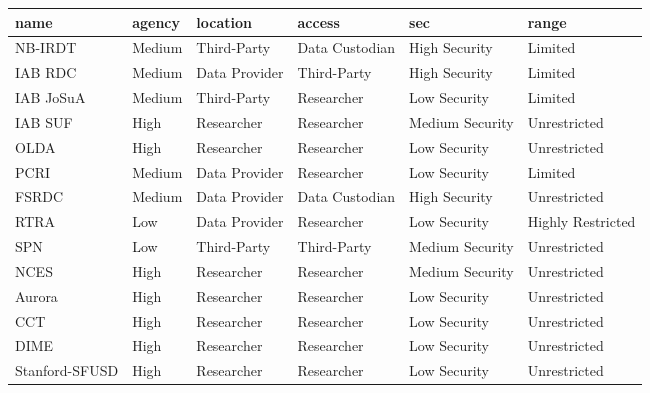 \begin{tabulary}{1.0\textwidth}{LLLLLL}
  \toprule
name & agency & location & access & sec & range \\ 
  \midrule
NB-IRDT & Medium & Third-Party & Data Custodian & High Security & Limited \\ 
  IAB RDC & Medium & Data Provider & Third-Party & High Security & Limited \\ 
  IAB JoSuA & Medium & Third-Party & Researcher & Low Security & Limited \\ 
  IAB SUF & High & Researcher & Researcher & Medium Security & Unrestricted \\ 
  OLDA & High & Researcher & Researcher & Low Security & Unrestricted \\ 
  PCRI & Medium & Data Provider & Researcher & Low Security & Limited \\ 
  FSRDC & Medium & Data Provider & Data Custodian & High Security & Unrestricted \\ 
  RTRA & Low & Data Provider & Researcher & Low Security & Highly Restricted \\ 
  SPN & Low & Third-Party & Third-Party & Medium Security & Unrestricted \\ 
  NCES & High & Researcher & Researcher & Medium Security & Unrestricted \\ 
  Aurora & High & Researcher & Researcher & Low Security & Unrestricted \\ 
  CCT & High & Researcher & Researcher & Low Security & Unrestricted \\ 
  DIME & High & Researcher & Researcher & Low Security & Unrestricted \\ 
  Stanford-SFUSD & High & Researcher & Researcher & Low Security & Unrestricted \\ 
   \bottomrule
\end{tabulary}
